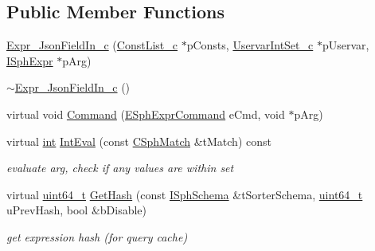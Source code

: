 \subsection*{Public Member Functions}
\begin{DoxyCompactItemize}
\item 
\hyperlink{classExpr__JsonFieldIn__c_a4c77dea69b24c09d5537f03470a2a4b4}{Expr\-\_\-\-Json\-Field\-In\-\_\-c} (\hyperlink{classConstList__c}{Const\-List\-\_\-c} $\ast$p\-Consts, \hyperlink{classUservarIntSet__c}{Uservar\-Int\-Set\-\_\-c} $\ast$p\-Uservar, \hyperlink{structISphExpr}{I\-Sph\-Expr} $\ast$p\-Arg)
\item 
\hyperlink{classExpr__JsonFieldIn__c_a9e02a55e958e3b968bc6275d409b63e5}{$\sim$\-Expr\-\_\-\-Json\-Field\-In\-\_\-c} ()
\item 
virtual void \hyperlink{classExpr__JsonFieldIn__c_a3ca5b9859bd1bf881431e4e453ec5e70}{Command} (\hyperlink{sphinxexpr_8h_a30be184fb07bd80c271360fc6094c818}{E\-Sph\-Expr\-Command} e\-Cmd, void $\ast$p\-Arg)
\item 
virtual \hyperlink{sphinxexpr_8cpp_a4a26e8f9cb8b736e0c4cbf4d16de985e}{int} \hyperlink{classExpr__JsonFieldIn__c_aeed6b078222998c11dfdd103c4c00194}{Int\-Eval} (const \hyperlink{classCSphMatch}{C\-Sph\-Match} \&t\-Match) const 
\begin{DoxyCompactList}\small\item\em evaluate arg, check if any values are within set \end{DoxyCompactList}\item 
virtual \hyperlink{sphinxstd_8h_aaa5d1cd013383c889537491c3cfd9aad}{uint64\-\_\-t} \hyperlink{classExpr__JsonFieldIn__c_a8cd12fea0603dd58c72ad6500e5c1b20}{Get\-Hash} (const \hyperlink{classISphSchema}{I\-Sph\-Schema} \&t\-Sorter\-Schema, \hyperlink{sphinxstd_8h_aaa5d1cd013383c889537491c3cfd9aad}{uint64\-\_\-t} u\-Prev\-Hash, bool \&b\-Disable)
\begin{DoxyCompactList}\small\item\em get expression hash (for query cache) \end{DoxyCompactList}\end{DoxyCompactItemize}
